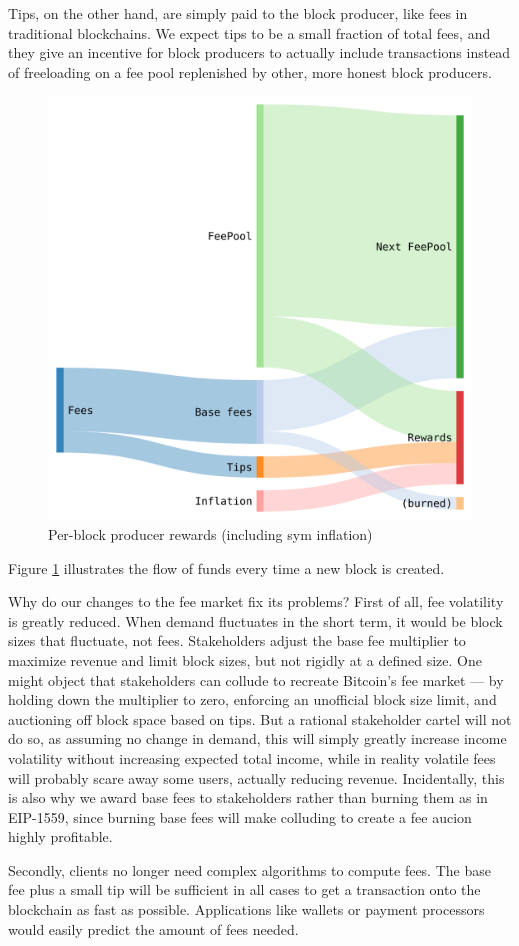 \documentclass[headinclude,12pt]{scrbook}
\begin{document}
Tips, on the other hand, are simply paid to the block producer, like fees in traditional blockchains. We expect tips to be a small fraction of total fees, and they give an incentive for block producers to actually include transactions instead of freeloading on a fee pool replenished by other, more honest block producers.

\begin{figure}
    \centering \includegraphics[width=0.5\linewidth]{fees.png}
    \caption{Per-block producer rewards (including sym inflation)}
    \label{fig:fees}
\end{figure}

Figure \ref{fig:fees} illustrates the flow of funds every time a new block is created.

Why do our changes to the fee market fix its problems? First of all, fee volatility is greatly reduced. When demand fluctuates in the short term, it would be block sizes that fluctuate, not fees. Stakeholders adjust the base fee multiplier to maximize revenue and limit block sizes, but not rigidly at a defined size. One might object that stakeholders can collude to recreate Bitcoin's fee market --- by holding down the multiplier to zero, enforcing an unofficial block size limit, and auctioning off block space based on tips. But a rational stakeholder cartel will not do so, as assuming no change in demand, this will simply greatly increase income volatility without increasing expected total income, while in reality volatile fees will probably scare away some users, actually reducing revenue. Incidentally, this is also why we award base fees to stakeholders rather than burning them as in EIP-1559, since burning base fees will make colluding to create a fee aucion highly profitable.

Secondly, clients no longer need complex algorithms to compute fees. The base fee plus a small tip will be sufficient in all cases to get a transaction onto the blockchain as fast as possible. Applications like wallets or payment processors would easily predict the amount of fees needed.
\end{document}

